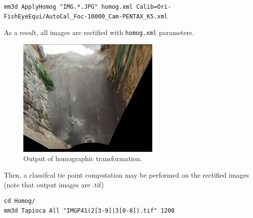 \begin{verbatim}
mm3d ApplyHomog "IMG.*.JPG" homog.xml Calib=Ori-FishEyeEqui/AutoCal_Foc-10000_Cam-PENTAX_K5.xml
\end{verbatim}

\noindent As a result, all images are rectified with \texttt{homog.xml} parameters. \newline

\begin{figure}[!h]
	\begin{center}
		\includegraphics[width=70mm]{FIGS/StreetSainMartin/rectified.jpg}
		\caption{Output of homographic transformation.}
	\end{center}	
\end{figure}

\noindent Then, a classifcal tie point computation may be performed on the rectified images (note that output images are .tif) \newline

\begin{verbatim}
cd Homog/
mm3d Tapioca All "IMGP41(2[3-9]|3[0-8]).tif" 1200
\end{verbatim} 

